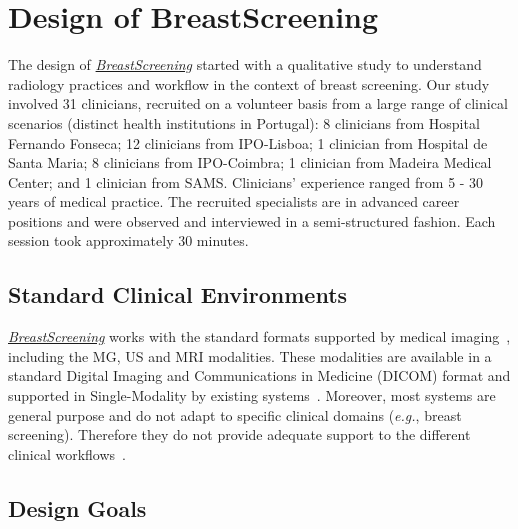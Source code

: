 \section{Design of BreastScreening}
\label{sec:sec003}

The design of \href{https://breastscreening.github.io/}{{\it BreastScreening}} started with a qualitative study to understand radiology practices and workflow in the context of breast screening.
Our study involved 31 clinicians, recruited on a volunteer basis from a large range of clinical scenarios (distinct health institutions in Portugal):
8 clinicians from Hospital Fernando Fonseca; %
12 clinicians from IPO-Lisboa; %
1 clinician from Hospital de Santa Maria; %
8 clinicians from IPO-Coimbra; %
1 clinician from Madeira Medical Center; and %
1 clinician from SAMS. %
Clinicians' experience ranged from 5 - 30 years of medical practice.
The recruited specialists are in advanced career positions and were observed and interviewed in a semi-structured fashion.
Each session took approximately 30 minutes.

\subsection{Standard Clinical Environments}

\href{https://breastscreening.github.io/}{{\it BreastScreening}} works with the standard formats supported by medical imaging~\cite{ng2017technical}, including the MG, US and MRI modalities.
These modalities are available in a standard  Digital Imaging and Communications in Medicine (DICOM) format and supported in Single-Modality by existing systems~\cite{henriksen2018efficacy}. Moreover, most systems are general purpose and do not adapt to specific clinical domains ({\it e.g.}, breast screening). Therefore they do not provide adequate support to the different clinical workflows~\cite{Calisto:2017:TTM:3132272.3134111}.

\subsection{Design Goals}

